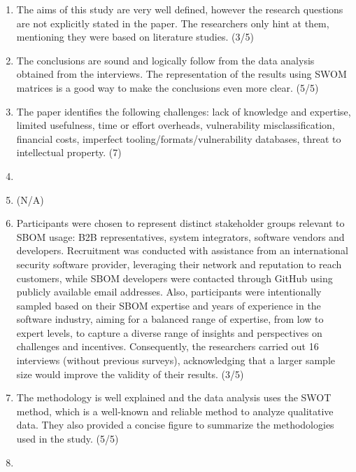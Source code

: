 \begin{enumerate}
    \item The aims of this study are very well defined, however the research questions are not explicitly stated in the paper. The researchers only hint at them, mentioning they were based on literature studies. (3/5)
    \item The conclusions are sound and logically follow from the data analysis obtained from the interviews. The representation of the results using SWOM matrices is a good way to make the conclusions even more clear. (5/5)
    \item The paper identifies the following challenges: lack of knowledge and expertise, limited usefulness, time or effort overheads, vulnerability misclassification, financial costs, imperfect tooling/formats/vulnerability databases, threat to intellectual property. (7)
    \item
    \item (N/A)
    \item Participants were chosen to represent distinct stakeholder groups relevant to SBOM usage: B2B representatives, system integrators, software vendors and developers. Recruitment was conducted with assistance from an international security software provider, leveraging their network and reputation to reach customers, while SBOM developers were contacted through GitHub using publicly available email addresses.
    Also, participants were intentionally sampled based on their SBOM expertise and years of experience in the software industry, aiming for a balanced range of expertise, from low to expert levels, to capture a diverse range of insights and perspectives on challenges and incentives.
    Consequently, the researchers carried out 16 interviews (without previous surveys), acknowledging that a larger sample size would improve the validity of their results. (3/5)
    \item The methodology is well explained and the data analysis uses the SWOT method, which is a well-known and reliable method to analyze qualitative data. They also provided a concise figure to summarize the methodologies used in the study. (5/5)
    \item
\end{enumerate}

